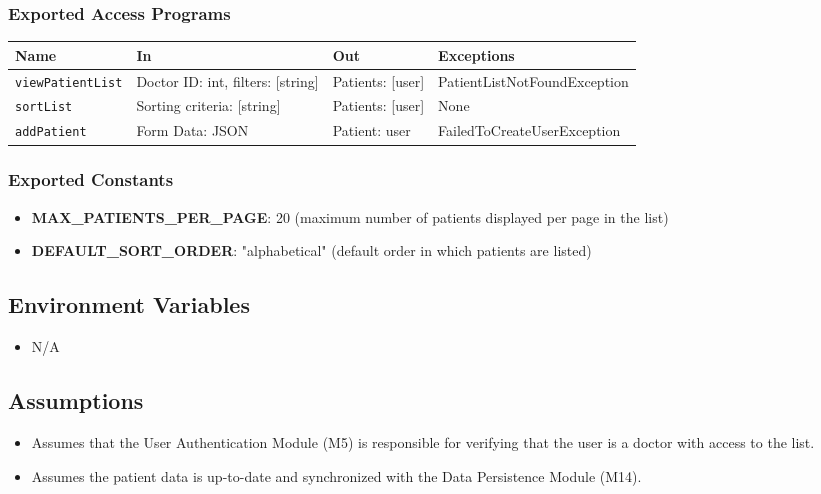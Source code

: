 \documentclass[12pt, titlepage]{article}
\begin{document}
\subsubsection{Exported Access Programs}
\begin{center}
  \renewcommand{\arraystretch}{1.2}
  \begin{tabularx}{\textwidth}{|l|X|X|l|}
    \hline
    \textbf{Name} & \textbf{In} & \textbf{Out} & \textbf{Exceptions} \\
    \hline 
    \texttt{viewPatientList} & Doctor ID: int, filters: [string] & Patients: [user] & PatientListNotFoundException \\
    \hline
    \texttt{sortList} & Sorting criteria: [string] & Patients: [user] & None \\
    \hline
    \texttt{addPatient} & Form Data: JSON & Patient: user & FailedToCreateUserException \\
    \hline
  \end{tabularx}
\end{center}

\subsubsection{Exported Constants}
\begin{itemize}
\item \textbf{MAX\_PATIENTS\_PER\_PAGE}: 20 (maximum number of patients displayed per page in the list)
\item \textbf{DEFAULT\_SORT\_ORDER}: "alphabetical" (default order in which patients are listed)
\end{itemize}

\subsection{Environment Variables}
\begin{itemize}
\item N/A
\end{itemize}

\subsection{Assumptions}
\begin{itemize}
\item Assumes that the User Authentication Module (M5) is responsible for verifying that the user is a doctor with access to the list.
\item Assumes the patient data is up-to-date and synchronized with the Data Persistence Module (M14).
\end{itemize}
\end{document}
